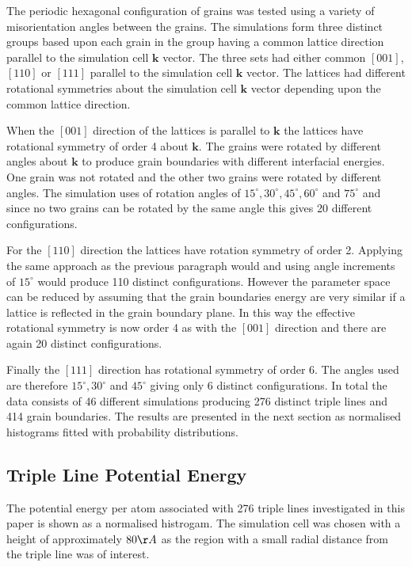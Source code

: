 \documentclass[12pt,a4paper]{book}
\begin{document}
The periodic hexagonal configuration of grains was tested using a variety of misorientation angles between the grains.  The simulations form three distinct groups based upon each grain in the group having a common lattice direction parallel to the simulation cell $\mathbf{k}$ vector. The three sets had either common $[0 0 1]$, $[1 1 0]$ or $[1 1 1]$ parallel to the simulation cell $\mathbf{k}$ vector. The lattices had different rotational symmetries about the simulation cell $\mathbf{k}$ vector depending upon the common lattice direction.

When the $[0 0 1]$ direction of the lattices is parallel to $\mathbf{k}$ the lattices have rotational symmetry of order 4 about $\mathbf{k}$.  The grains were rotated by different angles about $\mathbf{k}$ to produce grain boundaries with different interfacial energies. One grain was not rotated and the other two grains were rotated by different angles. The simulation uses of rotation angles of $15^{\circ},30^{\circ},45^{\circ},60^{\circ}$ and $75^{\circ}$ and since no two grains can be rotated by the same angle this gives 20 different configurations.

For the $[1 1 0]$ direction the lattices have rotation symmetry of order 2. Applying the same approach as the previous paragraph would and using angle increments of $15^{\circ}$ would produce 110 distinct configurations. However the parameter space can be reduced by assuming that the grain boundaries energy are very similar if a lattice is reflected in the grain boundary plane. In this way the effective rotational symmetry is now order 4 as with the $[0 0 1]$ direction and there are again 20 distinct configurations.  

Finally the $[1 1 1]$ direction has rotational symmetry of order 6. The angles used are therefore $15^{\circ},30^{\circ}$  and $45^{\circ}$ giving only 6 distinct configurations. In total the data consists of 46 different simulations producing 276 distinct triple lines and 414 grain boundaries. The results are presented in the next section as normalised histograms fitted with probability distributions.  

\subsection{Triple Line Potential Energy}

The potential energy per atom associated with 276 triple lines investigated in this paper is shown as a normalised histrogam. The simulation cell was chosen with a height of approximately $80\AA$ as the region with a small radial distance from the triple line was of interest. 
\end{document}
